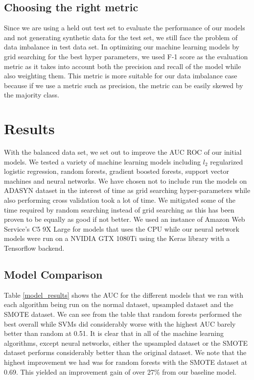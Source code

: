 \documentclass[twoside,11pt]{article}
\begin{document}
\subsection*{Choosing the right metric}
Since we are using a held out test set to evaluate the performance of our
models and not generating synthetic data for the test set, we still face the
problem of data imbalance in test data set. In optimizing our machine learning
models by grid searching for the best hyper parameters, we used F-1 score as the
evaluation metric as it takes into account both the precision and recall of the
model while also weighting them. This metric is more suitable for our data
imbalance case because if we use a metric such as precision, the metric can be
easily skewed by the majority class.

\section{Results} 
With the balanced data set, we set out to improve the AUC ROC of our initial
models. We tested a variety of machine learning models including $l_2$
regularized logistic regression, random forests, gradient boosted forests,
support vector machines and neural networks. We have chosen not to include run
the models on ADASYN dataset in the interest of time as grid searching
hyper-parameters while also performing cross validation took a lot of time. We
mitigated some of the time required by random searching instead of grid
searching as this has been proven to be equally as good if not better. \citep{randomsearching} 
We used an instance of Amazon Web Service's C5 9X Large for models that uses the
CPU while our neural network models were run on a NVIDIA GTX 1080Ti using the Keras
library with a Tensorflow backend.
\subsection*{Model Comparison}

Table \ref{model_results} shows the AUC for the different models that we ran with
each algorithm being run on the normal dataset, upsampled dataset and the SMOTE
dataset. We can see from the table that random forests performed the best
overall while SVMs did considerably worse with the highest AUC barely better
than random at 0.51. It is clear that in all of the machine learning algorithms,
except neural networks, either the upsampled dataset or the SMOTE dataset
performs considerably better than the original dataset. We note that the highest
improvement we had was for random forests with the SMOTE dataset at 0.69. This
yielded an improvement gain of over 27\% from our baseline model.
\end{document}
